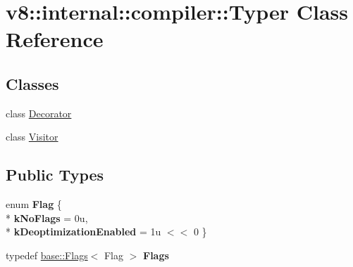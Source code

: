 \hypertarget{classv8_1_1internal_1_1compiler_1_1_typer}{}\section{v8\+:\+:internal\+:\+:compiler\+:\+:Typer Class Reference}
\label{classv8_1_1internal_1_1compiler_1_1_typer}
\subsection*{Classes}
\begin{DoxyCompactItemize}
\item 
class \hyperlink{classv8_1_1internal_1_1compiler_1_1_typer_1_1_decorator}{Decorator}
\item 
class \hyperlink{classv8_1_1internal_1_1compiler_1_1_typer_1_1_visitor}{Visitor}
\end{DoxyCompactItemize}
\subsection*{Public Types}
\begin{DoxyCompactItemize}
\item 
enum {\bfseries Flag} \{ \\*
{\bfseries k\+No\+Flags} = 0u, 
\\*
{\bfseries k\+Deoptimization\+Enabled} = 1u $<$$<$ 0
 \}\hypertarget{classv8_1_1internal_1_1compiler_1_1_typer_aff1857a765552203f6a0f15862f5f8ae}{}\label{classv8_1_1internal_1_1compiler_1_1_typer_aff1857a765552203f6a0f15862f5f8ae}

\item 
typedef \hyperlink{classv8_1_1base_1_1_flags}{base\+::\+Flags}$<$ Flag $>$ {\bfseries Flags}\hypertarget{classv8_1_1internal_1_1compiler_1_1_typer_a336f508fa4ab10c188bf3e7e00e21292}{}\label{classv8_1_1internal_1_1compiler_1_1_typer_a336f508fa4ab10c188bf3e7e00e21292}

\end{DoxyCompactItemize}
